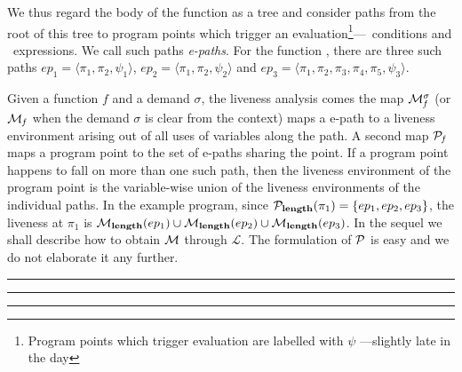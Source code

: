 \documentclass[9pt]{sigplanconf}
\begin{document}
We thus regard  the body of the function as a  tree and consider paths
from  the  root  of this  tree  to  program  points which  trigger  an
evaluation\footnote{Program  points which  trigger  evaluation  are
  labelled with  $\psi$ {\color {red} ---slightly late in the day}}---\SIF\ conditions and  \RETURN\ expressions.
We call such paths {\em e-paths}.  For the function \length, there are
three such paths $ep_1 = \langle \pi_1, \pi_2, \psi_1\rangle$, $ep_2 =
\langle\pi_1, \pi_2, \psi_2\rangle$ and  $ep_3 = \langle \pi_1, \pi_2,
\pi_3, \pi_4, \pi_5, \psi_3\rangle$.

  
Given  a function  $\mathit{f}$ and  a demand  $\sigma$,  the liveness
analysis   comes   the    map   $\cal{M}_{\mathit   f}^{\sigma}$   (or
$\cal{M}_{\mathit  f}$ when  the  demand $\sigma$  is  clear from  the
context) maps  a e-path to a  liveness environment arising  out of all
uses of variables  along the path. A second  map $\cal{P}_{\mathit f}$
maps a  program point to the set  of e-paths sharing the  point.  If a
program point  happens to fall  on more than  one such path,  then the
liveness environment  of the program point is  the variable-wise union
of the liveness environments of  the individual paths.  In the example
program,  since ${\mathcal P}_{\mathbf{length}}(\pi_1)  = \lbrace  ep_1, ep_2,
ep_3\rbrace$,  the liveness  at $\pi_1$  is  ${\cal M_{\mathbf{length}}}(ep_1)
\cup {\cal  M_{\ensuremath{\mathbf{length}}}}(ep_2)\cup {\cal M_{\ensuremath{\mathbf{length}}}}(ep_3)$.   In the
sequel   we   shall  describe   how   to   obtain  $\cal{M}$   through
$\mathcal{L}$.  The  formulation of  $\cal{P}$ is easy  and we  do not
elaborate it any further.

{\color{red}  \hrule \hrule \hrule  \medskip }  
\end{document}
